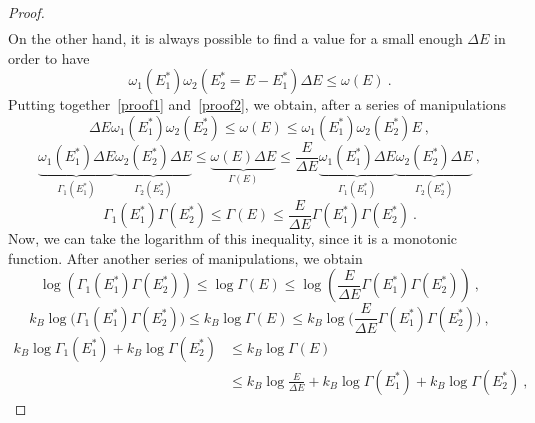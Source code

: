 \begin{proof}
\begin{equation}
\begin{aligned}
        \end{aligned}
        \end{equation}
        On the other hand, it is always possible to find a value for a small enough $\Delta E$ in order to have 
        \begin{equation} \label{proof2}
            \omega_1(E^*_1) \omega_2(E^*_2 = E - E^*_1) \Delta E \leq \omega(E) ~.
        \end{equation}
        Putting together~\eqref{proof1} and~\eqref{proof2}, we obtain, after a series of manipulations
        \begin{equation*}
            \Delta E \omega_1(E^*_1) \omega_2(E^*_2) \leq \omega(E) \leq \omega_1(E^*_1) \omega_2(E^*_2) E ~,
        \end{equation*}
        \begin{equation*}
            \underbrace{\omega_1(E^*_1) \Delta E}_{\Gamma_1 (E^*_1)} \underbrace{\omega_2(E^*_2) \Delta E}_{\Gamma_2 (E^*_2)} \leq \underbrace{\omega(E) \Delta E}_{\Gamma(E)} \leq \frac{E}{\Delta E} \underbrace{\omega_1(E^*_1) \Delta E}_{\Gamma_1 (E^*_1)} \underbrace{\omega_2(E^*_2) \Delta E}_{\Gamma_2 (E^*_2)} ~,
        \end{equation*}
        \begin{equation*}
            \Gamma_1(E^*_1) \Gamma(E^*_2) \leq \Gamma(E) \leq \frac{E}{\Delta E}\Gamma(E^*_1) \Gamma(E^*_2) ~.
        \end{equation*}
        Now, we can take the logarithm of this inequality, since it is a monotonic function. After another series of manipulations, we obtain
        \begin{equation*}
            \log ( \Gamma_1(E^*_1) \Gamma(E^*_2) ) \leq \log \Gamma(E) \leq \log ( \frac{E}{\Delta E}\Gamma(E^*_1) \Gamma(E^*_2) ) ~,
        \end{equation*}
        \begin{equation*}
            k_B \log \Big ( \Gamma_1(E^*_1) \Gamma(E^*_2) \Big ) \leq k_B \log \Gamma(E) \leq k_B \log \Big ( \frac{E}{\Delta E}\Gamma(E^*_1) \Gamma(E^*_2) \Big ) ~,
        \end{equation*}
        \begin{equation*}
        \begin{aligned}
            k_B \log \Gamma_1(E^*_1) + k_B \log \Gamma(E^*_2) & \leq k_B \log \Gamma(E) \\ & \leq k_B \log \frac{E}{\Delta E} + k_B \log \Gamma(E^*_1) + k_B \log \Gamma(E^*_2) ~,
        \end{aligned}

\end{equation*}
\end{proof}
